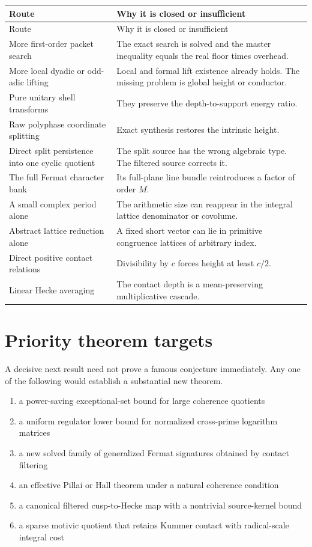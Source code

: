 \begin{longtable}{L{0.30\textwidth}L{0.60\textwidth}}
\toprule
Route & Why it is closed or insufficient\\
\midrule
\endfirsthead
\toprule
Route & Why it is closed or insufficient\\
\midrule
\endhead
More first-order packet search & The exact search is solved and the master inequality equals the real floor times overhead.\\
More local dyadic or odd-adic lifting & Local and formal lift existence already holds. The missing problem is global height or conductor.\\
Pure unitary shell transforms & They preserve the depth-to-support energy ratio.\\
Raw polyphase coordinate splitting & Exact synthesis restores the intrinsic height.\\
Direct split persistence into one cyclic quotient & The split source has the wrong algebraic type. The filtered source corrects it.\\
The full Fermat character bank & Its full-plane line bundle reintroduces a factor of order $M$.\\
A small complex period alone & The arithmetic size can reappear in the integral lattice denominator or covolume.\\
Abstract lattice reduction alone & A fixed short vector can lie in primitive congruence lattices of arbitrary index.\\
Direct positive contact relations & Divisibility by $c$ forces height at least $c/2$.\\
Linear Hecke averaging & The contact depth is a mean-preserving multiplicative cascade.\\
\bottomrule
\end{longtable}

\section{Priority theorem targets}
A decisive next result need not prove a famous conjecture immediately. Any one of the following would establish a substantial new theorem.

\begin{enumerate}[leftmargin=1.5em]
\item a power-saving exceptional-set bound for large coherence quotients
\item a uniform regulator lower bound for normalized cross-prime logarithm matrices
\item a new solved family of generalized Fermat signatures obtained by contact filtering
\item an effective Pillai or Hall theorem under a natural coherence condition
\item a canonical filtered cusp-to-Hecke map with a nontrivial source-kernel bound
\item a sparse motivic quotient that retains Kummer contact with radical-scale integral cost
\end{enumerate}

